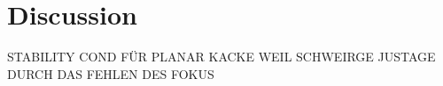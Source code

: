 \section{Discussion}


STABILITY COND FÜR PLANAR KACKE WEIL SCHWEIRGE JUSTAGE DURCH DAS FEHLEN DES FOKUS 